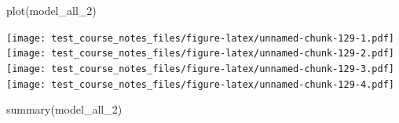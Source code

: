 \documentclass[
]{book}
\newenvironment{Shaded}{\begin{snugshade}}{\end{snugshade}}
\newcommand{\FunctionTok}[1]{\textcolor[rgb]{0.00,0.00,0.00}{#1}}
\newcommand{\NormalTok}[1]{#1}
\begin{document}
\begin{Shaded}
\begin{Highlighting}[]
\FunctionTok{plot}\NormalTok{(model\_all\_2)}
\end{Highlighting}
\end{Shaded}

\texttt{[image: test\_course\_notes\_files/figure-latex/unnamed-chunk-129-1.pdf]} \texttt{[image: test\_course\_notes\_files/figure-latex/unnamed-chunk-129-2.pdf]} \texttt{[image: test\_course\_notes\_files/figure-latex/unnamed-chunk-129-3.pdf]} \texttt{[image: test\_course\_notes\_files/figure-latex/unnamed-chunk-129-4.pdf]}

\begin{Shaded}
\begin{Highlighting}[]
\FunctionTok{summary}\NormalTok{(model\_all\_2)}
\end{Highlighting}
\end{Shaded}
\end{document}
